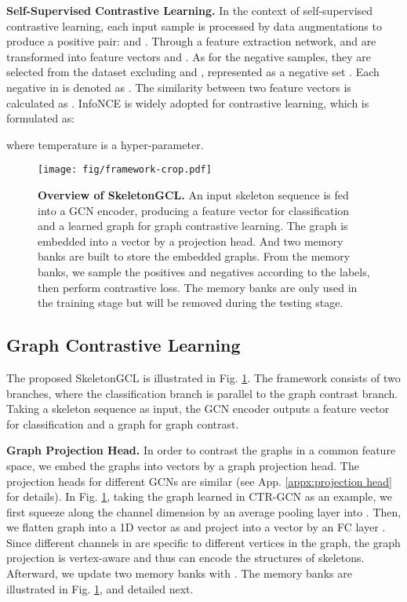 \documentclass{article} \usepackage{iclr2023_conference,times}
\begin{document}
\noindent \textbf{Self-Supervised Contrastive Learning.} In the context of self-supervised contrastive learning, each input sample is processed by data augmentations to produce a positive pair:  and . Through a feature extraction network,  and  are transformed into feature vectors  and . As for the negative samples, they are selected from the dataset excluding  and , represented as a negative set . Each negative in  is denoted as . The similarity between two feature vectors is calculated as . InfoNCE \citep{nce, oord2018representation} is widely adopted for contrastive learning, which is formulated as:

where temperature  is a hyper-parameter.
\begin{figure}[t]
    \centering
    \texttt{[image: fig/framework-crop.pdf]}
    \caption{\textbf{Overview of SkeletonGCL.} An input skeleton sequence  is fed into a GCN encoder, producing a feature vector  for classification and a learned graph  for graph contrastive learning. The graph  is embedded into a vector by a projection head. And two memory banks are built to store the embedded graphs. From the memory banks, we sample the positives and negatives according to the labels, then perform contrastive loss. The memory banks are only used in the training stage but will be removed during the testing stage.}
    \label{fig:framework}
\end{figure}
\subsection{Graph Contrastive Learning} The proposed SkeletonGCL is illustrated in Fig. \ref{fig:framework}. The framework consists of two branches, where the classification branch is parallel to the graph contrast branch. Taking a skeleton sequence  as input, the GCN encoder outputs a feature vector  for classification and a graph  for graph contrast. 

\noindent \textbf{Graph Projection Head.} In order to contrast the graphs in a common feature space, we embed the graphs into vectors by a graph projection head. The projection heads for different GCNs are similar (see App. \ref{appx:projection head} for details). In Fig. \ref{fig:framework}, taking the graph  learned in CTR-GCN \citep{CTRGCN} as an example, we first squeeze  along the channel dimension by an average pooling layer into . 
Then, we flatten graph  into a 1D vector as  and project  into a vector  by an FC layer . Since different channels in  are specific to different vertices in the graph, the graph projection is vertex-aware and thus can encode the structures of skeletons. Afterward, we update two memory banks with . The memory banks are illustrated in Fig. \ref{fig:framework}, and detailed next.
\end{document}
